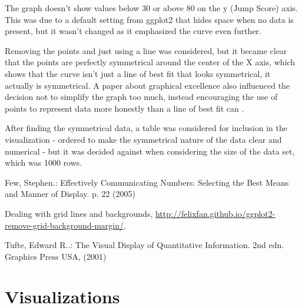 \documentclass[runningheads]{llncs}
\begin{document}
The graph doesn't show values below 30 or above 80 on the y (Jump Score) axis. This was due to a default setting from ggplot2 that hides space when no data is present, but it wasn't changed as it emphasized the curve even further.

Removing the points and just using a line was considered, but it became clear that the points are perfectly symmetrical around the center of the X axis, which shows that the curve isn't just a line of best fit that looks symmetrical, it actually is symmetrical. A paper about graphical excellence also influenced the decision not to simplify the graph too much, instead encouraging the use of points to represent data more honestly than a line of best fit can \cite{graphExcellence}.

After finding the symmetrical data, a table was considered for inclusion in the visualization - ordered to make the symmetrical nature of the data clear and numerical - but it was decided against when considering the size of the data set, which was 1000 rows.



%

\begin{thebibliography}{8}
Few, Stephen.: Effectively Communicating Numbers: Selecting the Best Means and Manner of Display. p. 22 (2005)

Dealing with grid lines and backgrounds, \url{http://felixfan.github.io/ggplot2-remove-grid-background-margin/}.

Tufte, Edward R..: The Visual Display of Quantitative Information. 2nd edn. Graphics Press USA,
(2001)

\end{thebibliography}
\newpage
\section{Visualizations}
\end{document}
